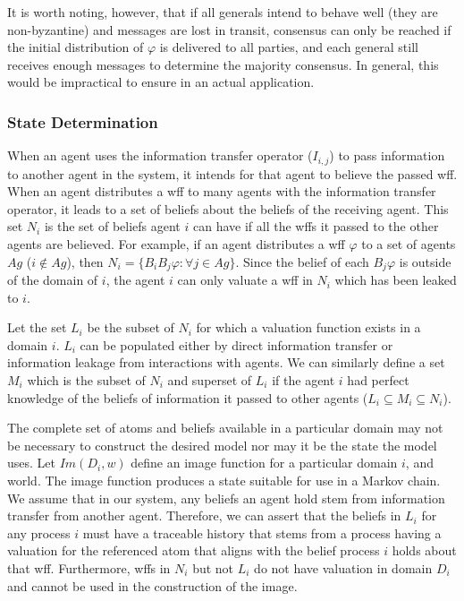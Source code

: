 It is worth noting, however, that if all generals intend to behave well (they are non-byzantine) and messages are lost in transit, consensus can only be reached if the initial distribution of $\varphi$ is delivered to all parties, and each general still receives enough messages to determine the majority consensus. In general, this would be impractical to ensure in an actual application.

\subsubsection{State Determination}

When an agent uses the information transfer operator ($I_{i,j}$) to pass information to another agent in the system, it intends for that agent to believe the passed wff. When an agent distributes a wff to many agents with the information transfer operator, it leads to a set of beliefs about the beliefs of the receiving agent. This set $N_i$ is the set of beliefs agent $i$ can have if all the wffs it passed to the other agents are believed. For example, if an agent distributes a wff $\varphi$ to a set of agents $Ag$ ($i \not \in Ag$), then $N_i = \{ B_i B_j \varphi : \forall j \in Ag \}$. Since the belief of each $B_j \varphi$ is outside of the domain of $i$, the agent $i$ can only valuate a wff in $N_i$ which has been leaked to $i$.

Let the set $L_i$ be the subset of $N_i$ for which a valuation function exists in a domain $i$. $L_i$ can be populated either by direct information transfer or information leakage from interactions with agents. We can similarly define a set $M_i$ which is the subset of $N_i$ and superset of $L_i$ if the agent $i$ had perfect knowledge of the beliefs of information it passed to other agents ($L_i \subseteq M_i \subseteq N_i$). 

The complete set of atoms and beliefs available in a particular domain may not be necessary to construct the desired model nor may it be the state the model uses. Let $Im(D_i, w)$ define an image function for a particular domain $i$, and world. The image function produces a state suitable for use in a Markov chain. We assume that in our system, any beliefs an agent hold stem from information transfer from another agent. Therefore, we can assert that the beliefs in $L_i$ for any process $i$ must have a traceable history that stems from a process having a valuation for the referenced atom that aligns with the belief process $i$ holds about that wff. Furthermore, wffs in $N_i$ but not $L_i$ do not have valuation in domain $D_i$ and cannot be used in the construction of the image.

